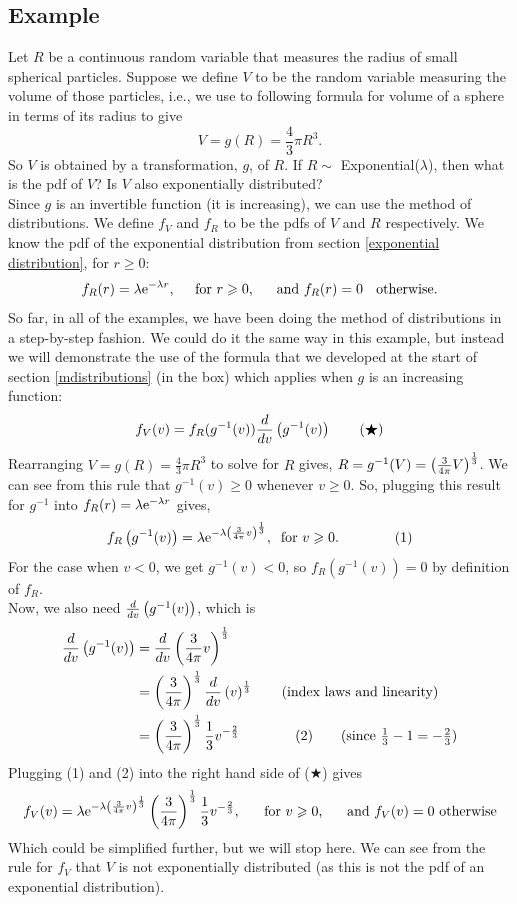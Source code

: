 \subsection{Example}
Let $R$ be a continuous random variable that measures the radius of small spherical particles. Suppose we define $V$ to be the random variable measuring the volume of those particles, i.e., we use to following formula for volume of a sphere in terms of its radius to give
\[
V = g(R) = \frac{4}{3}\pi R^3.
\]
So $V$ is obtained by a transformation, $g$, of $R$. If $R \sim$ Exponential($\lambda$), then what is the pdf of $V$? Is $V$ also exponentially distributed? \\

\solution
Since $g$ is an invertible function (it is increasing), we can use the method of distributions. We define $f_V$ and $f_R$ to be the pdfs of $V$ and $R$ respectively. We know the pdf of the exponential distribution from section \ref{exponential distribution}, for $r \geq 0$:
\[
f_R(r) = \lambda \mathrm{e}^{-\lambda r}, \;\;\;\;\; \text{for $r \geqslant 0$,\;\;\;\;\; and $f_R(r) = 0$ \; otherwise.}
\]
So far, in all of the examples, we have been doing the method of distributions in a step-by-step fashion. We could do it the same way in this example, but instead we will demonstrate the use of the formula that we developed at the start of section \ref{mdistributions} (in the box) which applies when $g$ is an increasing function:
\[
f_V(v) = f_R(g^{-1}(v))\frac{d}{dv}\left(g^{-1}(v)\right) \qquad (\bigstar)
\]
Rearranging $V = g(R) = \frac{4}{3}\pi R^3$ to solve for $R$ gives, $R = g^{-1}(V) = \left(\frac{3}{4\pi}V\right)^\frac{1}{3}$. We can see from this rule that $g^{-1}(v) \geq 0$ whenever $v \geq 0$. So, plugging this result for $g^{-1}$ into $f_R(r) = \lambda\mathrm{e}^{-\lambda r}$ gives,
\[
f_R\left(g^{-1}(v)\right) = \lambda\mathrm{e}^{-\lambda  \left(\frac{3}{4\pi}v\right)^\frac{1}{3}}, \;\; \text{for $v \geqslant 0$.} \qquad \qquad (1)
\]
For the case when $v < 0$, we get $g^{-1}(v) < 0$, so $f_R(g^{-1}(v)) = 0$ by definition of $f_R$. \\

\noindent Now, we also need $\frac{d}{dv}\left(g^{-1}(v)\right)$, which is
\begin{align*}
\frac{d}{dv}\brac{g^{-1}(v)} & = \frac{d}{dv}\brac{\frac{3}{4\pi}v}^\frac{1}{3} \\
	& = \brac{\frac{3}{4\pi}}^\frac{1}{3}\frac{d}{dv}\brac{v}^\frac{1}{3} \tag{index laws and linearity} \\
	& =  \brac{\frac{3}{4\pi}}^\frac{1}{3}\frac{1}{3}v^{-\frac{2}{3}} \qquad \qquad (2) \tag{since $\frac{1}{3} - 1 = -\frac{2}{3}$}
\end{align*}
Plugging (1) and (2) into the right hand side of ($\bigstar$) gives
\[
f_V(v) = \lambda\mathrm{e}^{-\lambda  \left(\frac{3}{4\pi}v\right)^\frac{1}{3}}\left(\frac{3}{4\pi}\right)^\frac{1}{3}\frac{1}{3}v^{-\frac{2}{3}}, \;\;\;\;\;\; \text{for $v \geqslant 0$, \;\;\;\; and $f_V(v) = 0$ otherwise}
\]
Which could be simplified further, but we will stop here. We can see from the rule for $f_V$ that $V$ is not exponentially distributed (as this is not the pdf of an exponential distribution).

